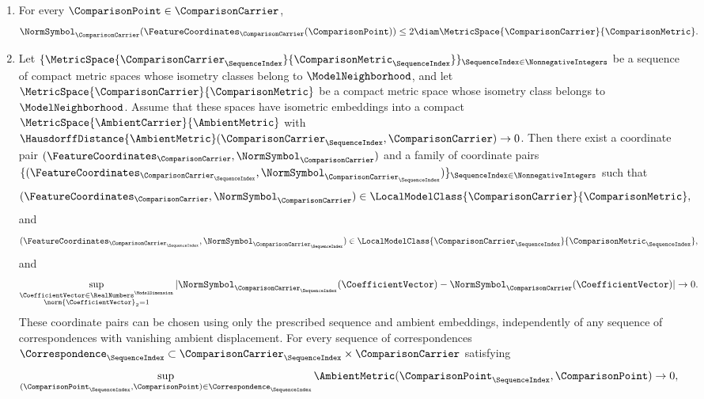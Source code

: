 \begin{theorem}
\begin{enumerate}[label=\textup{(A\arabic*)},ref=\textup{(A\arabic*)}]
and
\begin{equation}\label{eq:input-isometry-2}
 \NormSymbol_{\ComparisonCarrier_0}=\NormSymbol_\ComparisonCarrier\circ\OrthogonalChange^{-1}.
\end{equation}
\item\label{item:model-bound}
For every
$\ComparisonPoint \in \ComparisonCarrier $,
\[
 \NormSymbol _\ComparisonCarrier (\FeatureCoordinates _\ComparisonCarrier (\ComparisonPoint ))\leq2\diam\MetricSpace{\ComparisonCarrier }{\ComparisonMetric }.
\]
\item\label{item:model-continuity}
Let
$\{\MetricSpace{\ComparisonCarrier_\SequenceIndex}{\ComparisonMetric_\SequenceIndex}\}_{\SequenceIndex\in\NonnegativeIntegers}$
be a sequence of compact metric spaces whose isometry classes belong to
$\ModelNeighborhood$,
and let
$\MetricSpace{\ComparisonCarrier}{\ComparisonMetric}$
be a compact metric space whose isometry class belongs to
$\ModelNeighborhood$.
Assume that these spaces have isometric embeddings into a compact
$\MetricSpace{\AmbientCarrier }{\AmbientMetric }$
with
$\HausdorffDistance{\AmbientMetric }(\ComparisonCarrier _\SequenceIndex ,\ComparisonCarrier )\to0$.
Then there exist a coordinate pair
$(\FeatureCoordinates_\ComparisonCarrier,\NormSymbol_\ComparisonCarrier)$
and a family of coordinate pairs
$\{(\FeatureCoordinates_{\ComparisonCarrier_\SequenceIndex},\NormSymbol_{\ComparisonCarrier_\SequenceIndex})\}_{\SequenceIndex\in\NonnegativeIntegers}$
such that
\[
 (\FeatureCoordinates_\ComparisonCarrier,\NormSymbol_\ComparisonCarrier)
 \in\LocalModelClass{\ComparisonCarrier}{\ComparisonMetric},
\]
and
\[
 (\FeatureCoordinates_{\ComparisonCarrier_\SequenceIndex},\NormSymbol_{\ComparisonCarrier_\SequenceIndex})
 \in\LocalModelClass{\ComparisonCarrier_\SequenceIndex}{\ComparisonMetric_\SequenceIndex},
\]
and
\[
 \sup_{\substack{\CoefficientVector\in\RealNumbers^\ModelDimension\\\norm{\CoefficientVector}_2=1}}|\NormSymbol _{\ComparisonCarrier _\SequenceIndex }(\CoefficientVector )-\NormSymbol _\ComparisonCarrier (\CoefficientVector )|\to0.
\]
These coordinate pairs can be chosen using only the prescribed sequence
and ambient embeddings, independently of any sequence of correspondences with vanishing ambient displacement.
For every sequence of correspondences
$\Correspondence _\SequenceIndex \subset \ComparisonCarrier _\SequenceIndex \times \ComparisonCarrier $
satisfying
\[
 \sup_{(\ComparisonPoint _\SequenceIndex ,\ComparisonPoint )\in \Correspondence _\SequenceIndex }\AmbientMetric (\ComparisonPoint _\SequenceIndex ,\ComparisonPoint )\to0,
\]
\end{enumerate}
\end{theorem}
